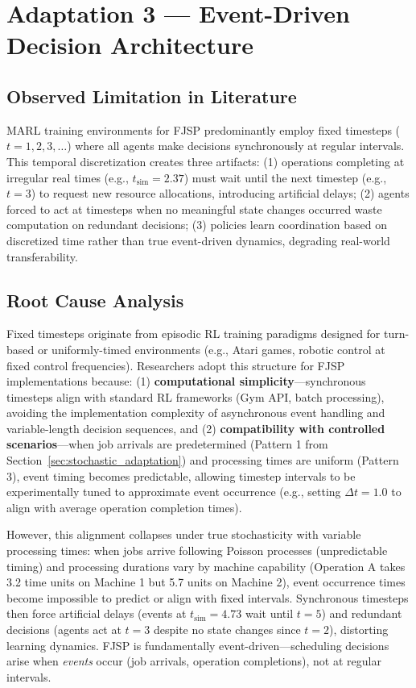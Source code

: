 \section{Adaptation 3 — Event-Driven Decision Architecture}
\label{sec:temporal_adaptation}

\subsection{Observed Limitation in Literature}

MARL training environments for FJSP predominantly employ fixed timesteps (\( t = 1, 2, 3, \ldots \)) where all agents make decisions synchronously at regular intervals. This temporal discretization creates three artifacts: (1) operations completing at irregular real times (e.g., \( t_{\text{sim}} = 2.37 \)) must wait until the next timestep (e.g., \( t = 3 \)) to request new resource allocations, introducing artificial delays; (2) agents forced to act at timesteps when no meaningful state changes occurred waste computation on redundant decisions; (3) policies learn coordination based on discretized time rather than true event-driven dynamics, degrading real-world transferability.

\subsection{Root Cause Analysis}

Fixed timesteps originate from episodic RL training paradigms designed for turn-based or uniformly-timed environments (e.g., Atari games, robotic control at fixed control frequencies). Researchers adopt this structure for FJSP implementations because: (1) \textbf{computational simplicity}—synchronous timesteps align with standard RL frameworks (Gym API, batch processing), avoiding the implementation complexity of asynchronous event handling and variable-length decision sequences, and (2) \textbf{compatibility with controlled scenarios}—when job arrivals are predetermined (Pattern 1 from Section~\ref{sec:stochastic_adaptation}) and processing times are uniform (Pattern 3), event timing becomes predictable, allowing timestep intervals to be experimentally tuned to approximate event occurrence (e.g., setting \( \Delta t = 1.0 \) to align with average operation completion times). 

However, this alignment collapses under true stochasticity with variable processing times: when jobs arrive following Poisson processes (unpredictable timing) and processing durations vary by machine capability (Operation A takes 3.2 time units on Machine 1 but 5.7 units on Machine 2), event occurrence times become impossible to predict or align with fixed intervals. Synchronous timesteps then force artificial delays (events at \( t_{\text{sim}} = 4.73 \) wait until \( t = 5 \)) and redundant decisions (agents act at \( t = 3 \) despite no state changes since \( t = 2 \)), distorting learning dynamics. FJSP is fundamentally event-driven—scheduling decisions arise when \textit{events} occur (job arrivals, operation completions), not at regular intervals.

